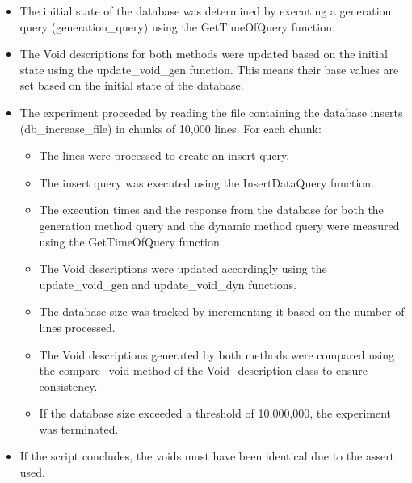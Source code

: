 \begin{itemize}
    \item The initial state of the database was determined by executing a generation query (generation\_query) using the GetTimeOfQuery function.
    
    \item The Void descriptions for both methods were updated based on the initial state using the update\_void\_gen function. This means their base values are set based on the initial state of the database.
    
    \item The experiment proceeded by reading the file containing the database inserts (db\_increase\_file) in chunks of 10,000 lines. For each chunk:
    
    \begin{itemize}
        \item The lines were processed to create an insert query.
        
        \item The insert query was executed using the InsertDataQuery function.
        
        \item The execution times and the response from the database for both the generation method query and the dynamic method query were measured using the GetTimeOfQuery function.
        
        \item The Void descriptions were updated accordingly using the update\_void\_gen and update\_void\_dyn functions.
        
        \item The database size was tracked by incrementing it based on the number of lines processed.
        
        \item The Void descriptions generated by both methods were compared using the compare\_void method of the Void\_description class to ensure consistency.
        
        \item If the database size exceeded a threshold of 10,000,000, the experiment was terminated.
    \end{itemize}
    
    \item If the script concludes, the voids must have been identical due to the assert used.
\end{itemize}



